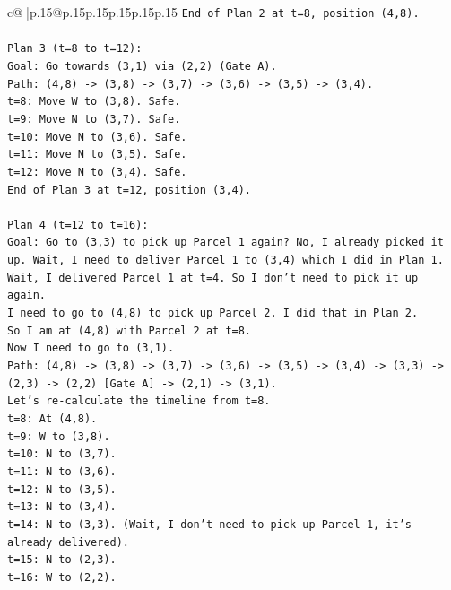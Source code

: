 \documentclass{article}
\begin{document}
{\begin{supertabular}{c@{$\;$}|p{.15\linewidth}@{}p{.15\linewidth}p{.15\linewidth}p{.15\linewidth}p{.15\linewidth}p{.15\linewidth}}
{{{\texttt{End of Plan 2 at t=8, position (4,8).} \\
\\ 
\texttt{Plan 3 (t=8 to t=12):} \\
\texttt{Goal: Go towards (3,1) via (2,2) (Gate A).} \\
\texttt{Path: (4,8) {-}> (3,8) {-}> (3,7) {-}> (3,6) {-}> (3,5) {-}> (3,4).} \\
\texttt{t=8: Move W to (3,8). Safe.} \\
\texttt{t=9: Move N to (3,7). Safe.} \\
\texttt{t=10: Move N to (3,6). Safe.} \\
\texttt{t=11: Move N to (3,5). Safe.} \\
\texttt{t=12: Move N to (3,4). Safe.} \\
\texttt{End of Plan 3 at t=12, position (3,4).} \\
\\ 
\texttt{Plan 4 (t=12 to t=16):} \\
\texttt{Goal: Go to (3,3) to pick up Parcel 1 again? No, I already picked it up. Wait, I need to deliver Parcel 1 to (3,4) which I did in Plan 1.} \\
\texttt{Wait, I delivered Parcel 1 at t=4. So I don't need to pick it up again.} \\
\texttt{I need to go to (4,8) to pick up Parcel 2. I did that in Plan 2.} \\
\texttt{So I am at (4,8) with Parcel 2 at t=8.} \\
\texttt{Now I need to go to (3,1).} \\
\texttt{Path: (4,8) {-}> (3,8) {-}> (3,7) {-}> (3,6) {-}> (3,5) {-}> (3,4) {-}> (3,3) {-}> (2,3) {-}> (2,2) {[}Gate A{]} {-}> (2,1) {-}> (3,1).} \\
\texttt{Let's re{-}calculate the timeline from t=8.} \\
\texttt{t=8: At (4,8).} \\
\texttt{t=9: W to (3,8).} \\
\texttt{t=10: N to (3,7).} \\
\texttt{t=11: N to (3,6).} \\
\texttt{t=12: N to (3,5).} \\
\texttt{t=13: N to (3,4).} \\
\texttt{t=14: N to (3,3). (Wait, I don't need to pick up Parcel 1, it's already delivered).} \\
\texttt{t=15: N to (2,3).} \\
\texttt{t=16: W to (2,2).} \\
}}}
\end{supertabular}}
\end{document}
